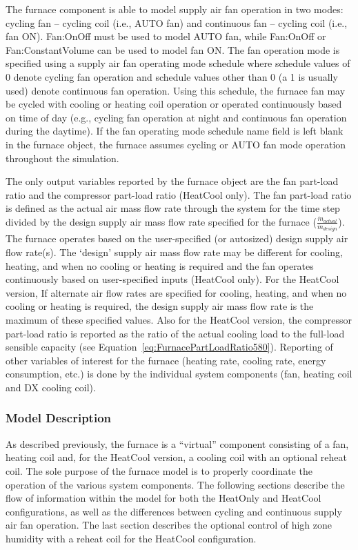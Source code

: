 The furnace component is able to model supply air fan operation in two modes: cycling fan -- cycling coil (i.e., AUTO fan) and continuous fan -- cycling coil (i.e., fan ON). Fan:OnOff must be used to model AUTO fan, while Fan:OnOff or Fan:ConstantVolume can be used to model fan ON. The fan operation mode is specified using a supply air fan operating mode schedule where schedule values of 0 denote cycling fan operation and schedule values other than 0 (a 1 is usually used) denote continuous fan operation. Using this schedule, the furnace fan may be cycled with cooling or heating coil operation or operated continuously based on time of day (e.g., cycling fan operation at night and continuous fan operation during the daytime). If the fan operating mode schedule name field is left blank in the furnace object, the furnace assumes cycling or AUTO fan mode operation throughout the simulation.

The only output variables reported by the furnace object are the fan part-load ratio and the compressor part-load ratio (HeatCool only). The fan part-load ratio is defined as the actual air mass flow rate through the system for the time step divided by the design supply air mass flow rate specified for the furnace (\({\frac{{{{\dot m}_{actual}}}}{{{\dot m}_{design}}}}\)). The furnace operates based on the user-specified (or autosized) design supply air flow rate(s). The `design' supply air mass flow rate may be different for cooling, heating, and when no cooling or heating is required and the fan operates continuously based on user-specified inputs (HeatCool only). For the HeatCool version, If alternate air flow rates are specified for cooling, heating, and when no cooling or heating is required, the design supply air mass flow rate is the maximum of these specified values. Also for the HeatCool version, the compressor part-load ratio is reported as the ratio of the actual cooling load to the full-load sensible capacity (see Equation~\ref{eq:FurnacePartLoadRatio580}). Reporting of other variables of interest for the furnace (heating rate, cooling rate, energy consumption, etc.) is done by the individual system components (fan, heating coil and DX cooling coil).

\subsubsection{Model Description}\label{model-description-1}

As described previously, the furnace is a ``virtual'' component consisting of a fan, heating coil and, for the HeatCool version, a cooling coil with an optional reheat coil. The sole purpose of the furnace model is to properly coordinate the operation of the various system components. The following sections describe the flow of information within the model for both the HeatOnly and HeatCool configurations, as well as the differences between cycling and continuous supply air fan operation. The last section describes the optional control of high zone humidity with a reheat coil for the HeatCool configuration.

